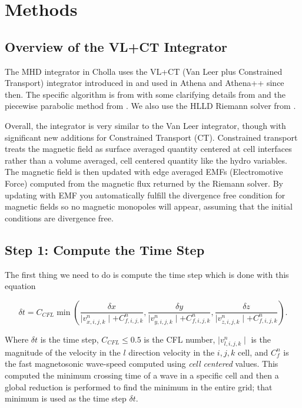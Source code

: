 \section{Methods}
\label{sec:methods}

\subsection*{Overview of the VL+CT Integrator}

The MHD integrator in Cholla uses the VL+CT (Van Leer plus Constrained Transport) integrator introduced in \cite{stone_2009} and used in Athena and Athena++ since then. The specific algorithm is from \cite{stone_2009} with some clarifying details from \cite{gardiner_2005,gardiner_unsplit_2008,stone_athena_2008} and the piecewise parabolic method from \cite{felker_2020}. We also use the HLLD Riemann solver from \cite{hlld_2005}.

Overall, the integrator is very similar to the Van Leer integrator, though with significant new additions for Constrained Transport (CT). Constrained transport treats the magnetic field as surface averaged quantity centered at cell interfaces rather than a volume averaged, cell centered quantity like the hydro variables. The magnetic field is then updated with edge averaged EMFs (Electromotive Force) computed from the magnetic flux returned by the Riemann solver. By updating with EMF you automatically fulfill the divergence free condition for magnetic fields so no magnetic monopoles will appear, assuming that the initial conditions are divergence free.

\subsection{Step 1: Compute the Time Step}
\label{vlct:dt}

The first thing we need to do is compute the time step which is done with this equation

$$
    \delta t = C_{CFL} \min \left(
        \frac{\delta x}{\mid v^n_{x,i,j,k} \mid + C^n_{f,i,j,k}},
        \frac{\delta y}{\mid v^n_{y,i,j,k} \mid + C^n_{f,i,j,k}},
        \frac{\delta z}{\mid v^n_{z,i,j,k} \mid + C^n_{f,i,j,k}}
    \right).
$$

Where $\delta t$ is the time step, $C_{CFL} \leq 0.5$ is the CFL number, $\mid v^n_{l,i,j,k}\mid $ is the magnitude of the velocity in the $l$ direction velocity in the ${i,j,k}$ cell, and $C^n_f $ is the fast magnetosonic wave-speed computed using \emph{cell centered} values. This computed the minimum crossing time of a wave in a specific cell and then a global reduction is performed to find the minimum in the entire grid; that minimum is used as the time step $\delta t$.


